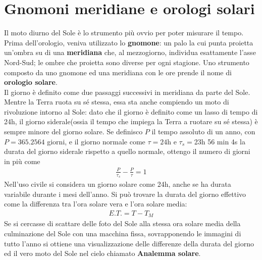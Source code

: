 \documentclass[a4paper, oneside]{book}
\begin{document}
\section{Gnomoni meridiane e orologi solari}
Il moto diurno del Sole è lo strumento più ovvio per poter misurare il tempo.
Prima dell'orologio, veniva utilizzato lo \textbf{gnomone}: un palo la cui punta proietta 
un'ombra su di una \textbf{meridiana} che, al mezzogiorno, individua esattamente
l'asse Nord-Sud; le ombre che proietta sono diverse per ogni stagione. Uno strumento composto
da uno gnomone ed una meridiana con le ore prende il nome di \textbf{orologio solare}. \\
Il giorno è definito come due passaggi successivi in meridiana da parte del Sole.
Mentre la Terra ruota su sé stessa, essa sta anche compiendo un moto di rivoluzione intorno al Sole:
dato che il giorno è definito come un lasso di tempo di 24h, il giorno siderale(ossia il tempo che 
impiega la Terra a ruotare su sé stessa) è sempre minore del giorno solare. Se definisco
$P$ il tempo assoluto di un anno, con $P = 365.2564$ giorni, e il giorno normale come $\tau = 24$h e
$\tau_s =$23h 56 min 4s la durata del giorno siderale rispetto a quello normale, ottengo il numero di giorni
in più come
\begin{gather*}
    \frac{P}{\tau_s} - \frac{P}{\tau} = 1
\end{gather*}
Nell'uso civile si considera un giorno solare come 24h, anche se ha
durata variabile durante i mesi dell'anno. Si può trovare la durata del giorno effettivo
come la differenza tra l'ora solare vera e l'ora solare media:
\begin{gather*}
    E.T. = T - T_M
\end{gather*}
Se si cercasse di scattare delle foto del Sole alla stessa ora solare media della culminazione del
Sole con una macchina fissa, sovrapponendo le immagini di tutto l'anno si ottiene una visualizzazione
delle differenze della durata del giorno ed il vero moto del Sole nel cielo chiamato \textbf{Analemma solare}.
\end{document}

